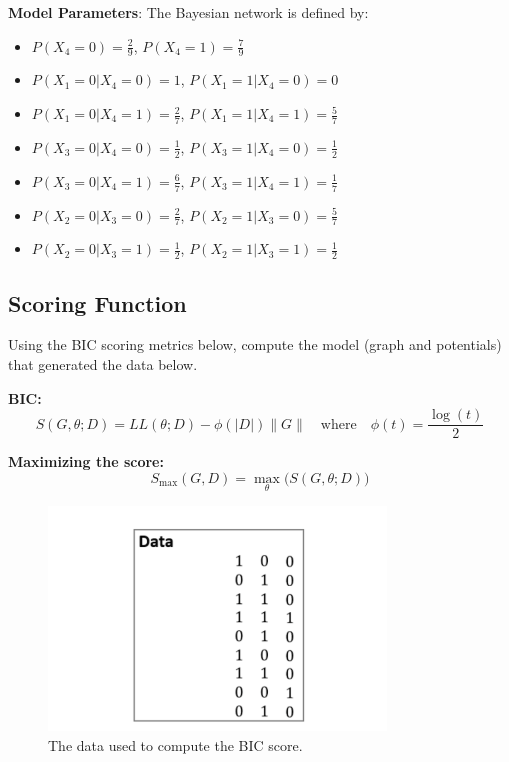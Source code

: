 \documentclass[a3paper,12pt]{extarticle} %
\begin{document}
\begin{enumerate}
\textbf{Model Parameters}:
The Bayesian network is defined by:
\begin{itemize}
    \item \(P(X_4 = 0) = \frac{2}{9}\), \(P(X_4 = 1) = \frac{7}{9}\)
    \item \(P(X_1 = 0 | X_4 = 0) = 1\), \(P(X_1 = 1 | X_4 = 0) = 0\)
    \item \(P(X_1 = 0 | X_4 = 1) = \frac{2}{7}\), \(P(X_1 = 1 | X_4 = 1) = \frac{5}{7}\)
    \item \(P(X_3 = 0 | X_4 = 0) = \frac{1}{2}\), \(P(X_3 = 1 | X_4 = 0) = \frac{1}{2}\)
    \item \(P(X_3 = 0 | X_4 = 1) = \frac{6}{7}\), \(P(X_3 = 1 | X_4 = 1) = \frac{1}{7}\)
    \item \(P(X_2 = 0 | X_3 = 0) = \frac{2}{7}\), \(P(X_2 = 1 | X_3 = 0) = \frac{5}{7}\)
    \item \(P(X_2 = 0 | X_3 = 1) = \frac{1}{2}\), \(P(X_2 = 1 | X_3 = 1) = \frac{1}{2}\)
\end{itemize}


\end{enumerate}

\subsection{Scoring Function}
Using the BIC scoring metrics below, compute the model (graph and potentials) that generated the data below. 

\textbf{BIC:}
\[
S(G, \theta; D) = LL(\theta; D) - \phi(|D|)\|G\| \quad \text{where} \quad \phi(t) = \frac{\log(t)}{2}
\]

\textbf{Maximizing the score:}
\[
S_{\text{max}}(G, D) = \max_{\theta} \big(S(G, \theta; D)\big)
\]

\begin{figure}[H]
\centering
\includegraphics[width=0.8\textwidth]{q2.png}
\caption{The data used to compute the BIC score.}
\label{fig:data}
\end{figure}
\end{document}

